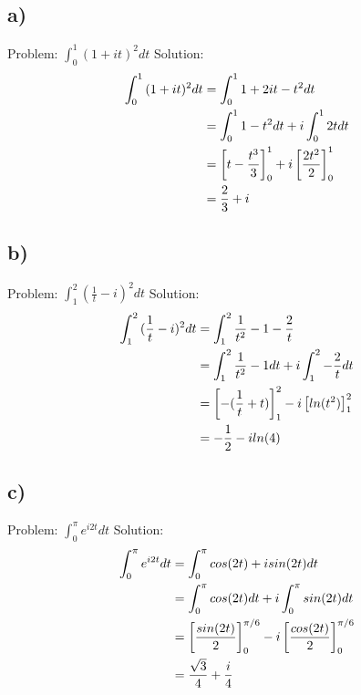 \documentclass[notitlepage]{article}
\begin{document}
\subsection*{a)}
    Problem: $\int_0^1{(1+it)^2dt}$
    Solution: \\
\begin{equation}
    \begin{aligned}
        \int_0^1{(1+it)^2dt}    &= \int_0^1{1+2it-t^2dt} \notag \\
                                &= \int_0^1{1-t^2dt} + i\int_0^1{2tdt} \\
                                &= \left[t-\frac{t^3}{3}\right]_0^1 + i\left[\frac{2t^2}{2}\right]_0^1 \\
                                &= \frac{2}{3} + i
    \end{aligned}
\end{equation}

\subsection*{b)}
    Problem: $\int_1^2{(\frac{1}{t}-i)^2dt}$
    Solution: \\
\begin{equation}
    \begin{aligned}
        \int_1^2{(\frac{1}{t}-i)^2dt}   &= \int_1^2{\frac{1}{t^2}-1-\frac{2}{t}} \notag \\
                                        &= \int_1^2{\frac{1}{t^2}-1dt} + i\int_1^2{-\frac{2}{t}dt} \\
                                        &= \left[-(\frac{1}{t}+t)\right]_1^2 - i\left[ln(t^2)\right]_1^2 \\
                                        &= -\frac{1}{2} - iln(4)
    \end{aligned}
\end{equation}

\subsection*{c)}
    Problem: $\int_0^\pi{e^{i2t}dt}$
    Solution: \\
\begin{equation}
    \begin{aligned}
       \int_0^\pi{e^{i2t}dt}    &= \int_0^\pi{cos(2t)+isin(2t)dt} \notag \\
                                &= \int_0^\pi{cos(2t)dt} + i\int_0^\pi{sin(2t)dt} \\
                                &= \left[\frac{sin(2t)}{2}\right]_0^{\pi/6} - i\left[\frac{cos(2t)}{2}\right]_0^{\pi/6} \\
                                &= \frac{\sqrt 3}{4} + \frac{i}{4}
    \end{aligned}
\end{equation}
\end{document}
